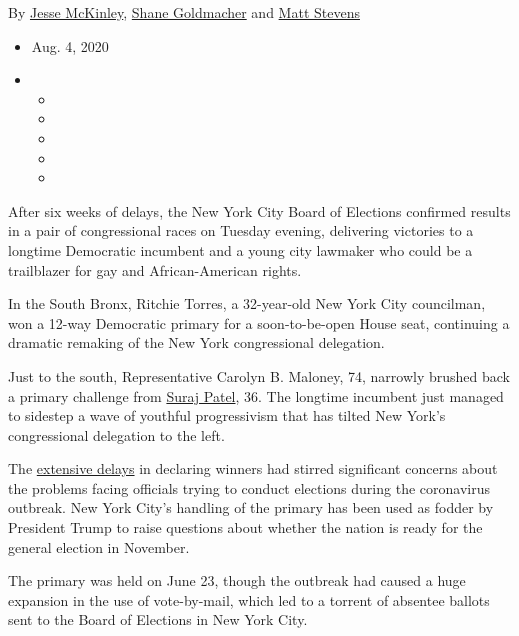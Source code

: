 By \href{https://www.nytimes3xbfgragh.onion/by/jesse-mckinley}{Jesse
McKinley},
\href{https://www.nytimes3xbfgragh.onion/by/shane-goldmacher}{Shane
Goldmacher} and
\href{https://www.nytimes3xbfgragh.onion/by/matt-stevens}{Matt Stevens}

\begin{itemize}
\item
  Aug. 4, 2020
\item
  \begin{itemize}
  \item
  \item
  \item
  \item
  \item
  \end{itemize}
\end{itemize}

After six weeks of delays, the New York City Board of Elections
confirmed results in a pair of congressional races on Tuesday evening,
delivering victories to a longtime Democratic incumbent and a young city
lawmaker who could be a trailblazer for gay and African-American rights.

In the South Bronx, Ritchie Torres, a 32-year-old New York City
councilman, won a 12-way Democratic primary for a soon-to-be-open House
seat, continuing a dramatic remaking of the New York congressional
delegation.

Just to the south, Representative Carolyn B. Maloney, 74, narrowly
brushed back a primary challenge from
\href{https://www.nytimes3xbfgragh.onion/2018/06/21/nyregion/congress-primaries-democrats-midterm-ny.html}{Suraj
Patel}, 36. The longtime incumbent just managed to sidestep a wave of
youthful progressivism that has tilted New York's congressional
delegation to the left.

The
\href{https://www.nytimes3xbfgragh.onion/2020/08/03/nyregion/nyc-mail-ballots-voting.html}{extensive
delays} in declaring winners had stirred significant concerns about the
problems facing officials trying to conduct elections during the
coronavirus outbreak. New York City's handling of the primary has been
used as fodder by President Trump to raise questions about whether the
nation is ready for the general election in November.

The primary was held on June 23, though the outbreak had caused a huge
expansion in the use of vote-by-mail, which led to a torrent of absentee
ballots sent to the Board of Elections in New York City.

